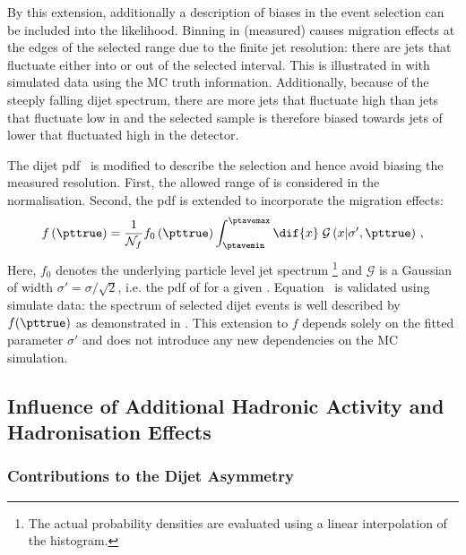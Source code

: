 By this extension, additionally a description of biases in the event selection can be included into the likelihood.
Binning in (measured) \ptave causes migration effects at the edges of the selected \ptave range due to the finite jet \pt resolution:
there are jets that fluctuate either into or out of the selected interval.
This is illustrated in  with simulated data using the MC truth information.
Additionally, because of the steeply falling dijet \pt spectrum, there are more jets that fluctuate high than jets that fluctuate low in \pt and the selected sample is therefore biased towards jets of lower \ptgen that fluctuated high in the detector.

The dijet pdf~ is modified to describe the
\ptave selection and hence avoid biasing the measured resolution.
First, the allowed range of \ptave is considered in the normalisation. 
Second, the \pttrue pdf is extended to incorporate the migration effects:
\begin{equation}
  \label{eq:ResFit:DataDriven:ModifiedSpectrum}
  f\left(\pttrue\right) = \frac{1}{\mathcal{N}_{f}}
  f_{0}\left(\pttrue\right) \int^{\ptavemax}_{\ptavemin}\dif{x}\;\mathcal{G}\left(x|\sigma',\pttrue\right) \, ,
\end{equation}
Here, $f_{0}$ denotes the underlying particle level jet \pt spectrum \footnote{The actual probability densities are evaluated using a linear interpolation of the histogram.} and $\mathcal{G}$ is a Gaussian of width \mbox{$\sigma' = \sigma/\sqrt{2}$}, i.e. the pdf of \ptave for a given \pttrue.
Equation~ is validated using simulate data:
the \ptgen spectrum of selected dijet events is well described by $f(\pttrue)$ as demonstrated in .
This extension to $f$ depends solely on the fitted parameter $\sigma'$ and does not introduce any new dependencies on the MC simulation.



\subsection{Influence of Additional Hadronic Activity and Hadronisation Effects}\label{sec:ResFit:DataDriven:AddJets}

\subsubsection{Contributions to the Dijet Asymmetry}\label{sec:ResFit:DataDriven:AddJets:Contributions}

